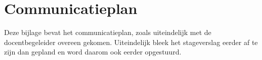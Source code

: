 \chapter{Communicatieplan}

Deze bijlage bevat het communicatieplan, zoals uiteindelijk met de docentbegeleider overeen gekomen. Uiteindelijk bleek het stageverslag eerder af te zijn dan gepland en word daarom ook eerder opgestuurd.


